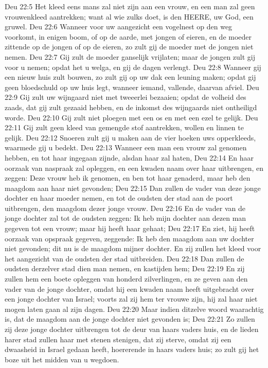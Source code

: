 Deu 22:5  Het kleed eens mans zal niet zijn aan een vrouw, en een man zal geen vrouwenkleed aantrekken; want al wie zulks doet, is den HEERE, uw God, een gruwel.
Deu 22:6  Wanneer voor uw aangezicht een vogelnest op den weg voorkomt, in enigen boom, of op de aarde, met jongen of eieren, en de moeder zittende op de jongen of op de eieren, zo zult gij de moeder met de jongen niet nemen.
Deu 22:7  Gij zult de moeder ganselijk vrijlaten; maar de jongen zult gij voor u nemen; opdat het u welga, en gij de dagen verlengt.
Deu 22:8  Wanneer gij een nieuw huis zult bouwen, zo zult gij op uw dak een leuning maken; opdat gij geen bloedschuld op uw huis legt, wanneer iemand, vallende, daarvan afviel.
Deu 22:9  Gij zult uw wijngaard niet met tweeerlei bezaaien; opdat de volheid des zaads, dat gij zult gezaaid hebben, en de inkomst des wijngaards niet ontheiligd worde.
Deu 22:10  Gij zult niet ploegen met een os en met een ezel te gelijk.
Deu 22:11  Gij zult geen kleed van gemengde stof aantrekken, wollen en linnen te gelijk.
Deu 22:12  Snoeren zult gij u maken aan de vier hoeken uws opperkleeds, waarmede gij u bedekt.
Deu 22:13  Wanneer een man een vrouw zal genomen hebben, en tot haar ingegaan zijnde, alsdan haar zal haten,
Deu 22:14  En haar oorzaak van naspraak zal opleggen, en een kwaden naam over haar uitbrengen, en zeggen: Deze vrouw heb ik genomen, en ben tot haar genaderd, maar heb den maagdom aan haar niet gevonden;
Deu 22:15  Dan zullen de vader van deze jonge dochter en haar moeder nemen, en tot de oudsten der stad aan de poort uitbrengen, den maagdom dezer jonge vrouw.
Deu 22:16  En de vader van de jonge dochter zal tot de oudsten zeggen: Ik heb mijn dochter aan dezen man gegeven tot een vrouw; maar hij heeft haar gehaat;
Deu 22:17  En ziet, hij heeft oorzaak van opspraak gegeven, zeggende: Ik heb den maagdom aan uw dochter niet gevonden; dit nu is de maagdom mijner dochter. En zij zullen het kleed voor het aangezicht van de oudsten der stad uitbreiden.
Deu 22:18  Dan zullen de oudsten derzelver stad dien man nemen, en kastijden hem;
Deu 22:19  En zij zullen hem een boete opleggen van honderd zilverlingen, en ze geven aan den vader van de jonge dochter, omdat hij een kwaden naam heeft uitgebracht over een jonge dochter van Israel; voorts zal zij hem ter vrouwe zijn, hij zal haar niet mogen laten gaan al zijn dagen.
Deu 22:20  Maar indien ditzelve woord waarachtig is, dat de maagdom aan de jonge dochter niet gevonden is;
Deu 22:21  Zo zullen zij deze jonge dochter uitbrengen tot de deur van haars vaders huis, en de lieden harer stad zullen haar met stenen stenigen, dat zij sterve, omdat zij een dwaasheid in Israel gedaan heeft, hoererende in haars vaders huis; zo zult gij het boze uit het midden van u wegdoen.
